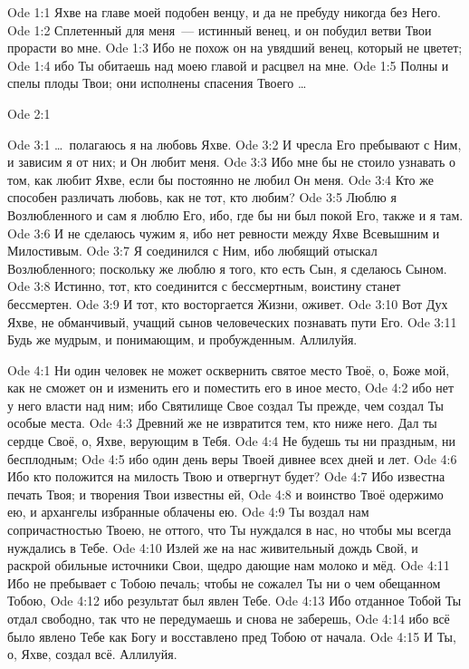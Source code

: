 \vs Ode 1:1
Яхве на
главе моей подобен венцу, и да не пребуду никогда без Него.
\vs Ode 1:2
Сплетенный
для меня~--- истинный венец, и он побудил ветви Твои прорасти во мне.
\vs Ode 1:3
Ибо не похож
он на увядший венец, который не цветет;
\vs Ode 1:4
ибо Ты
обитаешь над моею главой и расцвел на мне.
\vs Ode 1:5
Полны и
спелы плоды Твои; они исполнены спасения Твоего \ldots

\vs Ode 2:1

\vs Ode 3:1
\ldots\ полагаюсь я на любовь Яхве.
\vs Ode 3:2
И чресла Его
пребывают с Ним, и зависим я от них; и Он любит меня.
\vs Ode 3:3
Ибо мне бы
не стоило узнавать о том, как любит Яхве, если бы постоянно не любил Он меня.
\vs Ode 3:4
Кто же
способен различать любовь, как не тот, кто любим?
\vs Ode 3:5
Люблю я
Возлюбленного и сам я люблю Его, ибо, где бы ни был покой Его, также и я там.
\vs Ode 3:6
И не
сделаюсь чужим я, ибо нет ревности между Яхве Всевышним и Милостивым.
\vs Ode 3:7
Я соединился
с Ним, ибо любящий отыскал Возлюбленного; поскольку же люблю я того, кто есть
Сын, я сделаюсь Сыном.
\vs Ode 3:8
Истинно,
тот, кто соединится с бессмертным, воистину станет бессмертен.
\vs Ode 3:9
И тот, кто
восторгается Жизни, оживет.
\vs Ode 3:10
Вот Дух Яхве, не обманчивый, учащий сынов человеческих познавать пути Его.
\vs Ode 3:11
Будь же
мудрым, и понимающим, и пробужденным.
Аллилуйя.

\vs Ode 4:1
Ни один
человек не может осквернить святое место Твоё, о, Боже мой, как не сможет он и
изменить его и поместить его в иное место,
\vs Ode 4:2
ибо нет у
него власти над ним; ибо Святилище Свое создал Ты прежде, чем создал Ты особые
места.
\vs Ode 4:3
Древний же
не извратится тем, кто ниже него. Дал ты сердце Своё, о, Яхве, верующим в
Тебя.
\vs Ode 4:4
Не будешь ты
ни праздным, ни бесплодным;
\vs Ode 4:5
ибо один
день веры Твоей дивнее всех дней и лет.
\vs Ode 4:6
Ибо кто
положится на милость Твою и отвергнут будет?
\vs Ode 4:7
Ибо известна
печать Твоя; и творения Твои известны ей,
\vs Ode 4:8
и воинство
Твоё одержимо ею, и архангелы избранные облачены ею.
\vs Ode 4:9
Ты воздал
нам сопричастностью Твоею, не оттого, что Ты нуждался в нас, но чтобы мы
всегда нуждались в Тебе.
\vs Ode 4:10
Излей же на
нас живительный дождь Свой, и раскрой обильные источники Свои, щедро дающие
нам молоко и мёд.
\vs Ode 4:11
Ибо не
пребывает с Тобою печаль; чтобы не сожалел Ты ни о чем обещанном Тобою,
\vs Ode 4:12
ибо
результат был явлен Тебе.
\vs Ode 4:13
Ибо
отданное Тобой Ты отдал свободно, так что не передумаешь и снова не заберешь,
\vs Ode 4:14
ибо всё
было явлено Тебе как Богу и восставлено пред Тобою от начала.
\vs Ode 4:15
И Ты, о,
Яхве, создал всё.
Аллилуйя.

